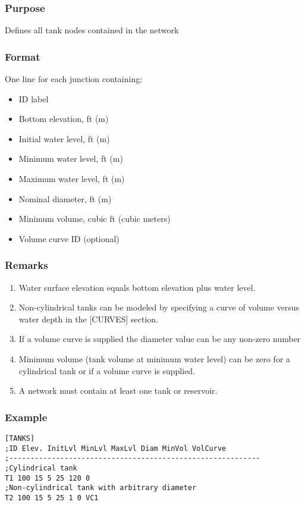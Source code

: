   \subsubsection{Purpose}
  Defines all tank nodes contained in the network
  \subsubsection{Format}
    One line for each junction containing:
  \begin{itemize}
    \item ID label
    \item Bottom elevation, ft (m)
    \item Initial water level, ft (m)
    \item Minimum water level, ft (m)
    \item Maximum water level, ft (m)
    \item Nominal diameter, ft (m)
    \item Minimum volume, cubic ft (cubic meters)
    \item Volume curve ID (optional)
  \end{itemize}
  \subsubsection{Remarks}
  \begin{enumerate}
    \item Water surface elevation equals bottom elevation plus water level.
    \item Non-cylindrical tanks can be modeled by specifying a curve of volume 
          versus water depth in the [CURVES] section.
    \item If a volume curve is supplied the diameter value can be any non-zero number
    \item Minimum volume (tank volume at minimum water level) can be zero for a cylindrical
         tank or if a volume curve is supplied.
    \item A network must contain at least one tank or reservoir.
  \end{enumerate}
  \subsubsection{Example}
\begin{verbatim}[TANKS]
;ID Elev. InitLvl MinLvl MaxLvl Diam MinVol VolCurve
;-----------------------------------------------------------
;Cylindrical tank
T1 100 15 5 25 120 0
;Non-cylindrical tank with arbitrary diameter
T2 100 15 5 25 1 0 VC1
\end{verbatim}



